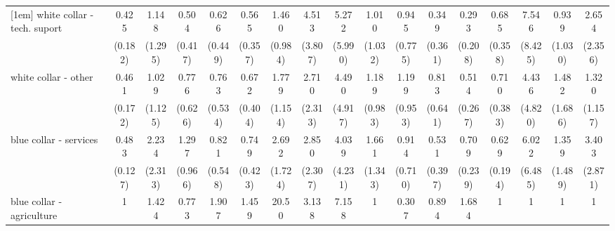 {\begin{tabular}{l*{16}{c}}
[1em]
white collar - tech. suport&       0.425\sym{*}  &       1.148         &       0.504         &       0.626         &       0.565         &       1.460         &       4.513         &       5.272         &       1.010         &       0.945         &       0.349         &       0.293         &       0.685         &       7.546         &       0.939         &       2.654         \\
                    &     (0.182)         &     (1.295)         &     (0.417)         &     (0.449)         &     (0.357)         &     (0.984)         &     (3.807)         &     (5.990)         &     (1.032)         &     (0.775)         &     (0.361)         &     (0.208)         &     (0.358)         &     (8.425)         &     (1.030)         &     (2.356)         \\
[1em]
white collar - other&       0.461\sym{*}  &       1.029         &       0.776         &       0.763         &       0.672         &       1.779         &       2.710         &       4.490         &       1.189         &       1.199         &       0.813         &       0.514         &       0.710         &       4.436         &       1.482         &       1.320         \\
                    &     (0.172)         &     (1.125)         &     (0.626)         &     (0.534)         &     (0.404)         &     (1.154)         &     (2.313)         &     (4.917)         &     (0.983)         &     (0.953)         &     (0.641)         &     (0.267)         &     (0.383)         &     (4.820)         &     (1.686)         &     (1.157)         \\
[1em]
blue collar - services&       0.483\sym{**} &       2.234         &       1.297         &       0.821         &       0.749         &       2.692         &       2.850         &       4.039         &       1.661         &       0.914         &       0.531         &       0.709         &       0.629         &       6.022         &       1.359         &       3.403         \\
                    &     (0.127)         &     (2.313)         &     (0.966)         &     (0.548)         &     (0.423)         &     (1.724)         &     (2.307)         &     (4.231)         &     (1.343)         &     (0.710)         &     (0.397)         &     (0.239)         &     (0.194)         &     (6.485)         &     (1.489)         &     (2.871)         \\
[1em]
blue collar - agriculture&           1         &       1.424         &       0.773         &       1.907         &       1.459         &       20.50\sym{***}&       3.138         &       7.158         &           1         &       0.307         &       0.894         &       1.684         &           1         &           1         &           1         &           1         \\

\end{tabular}}
